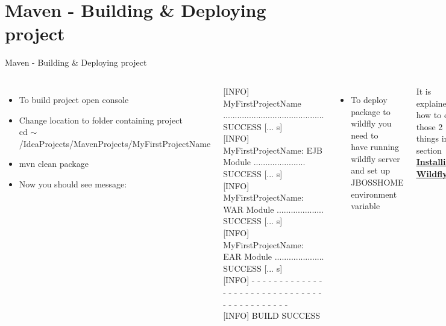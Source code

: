 \documentclass[aspectratio=1610,english]{beamer} %
\begin{document}
	\section{Maven - Building \& Deploying project}
	\begin{frame}{Maven - Building \& Deploying project}
		\begin{columns}
				\begin{itemize}
					\tiny
					\color{black}
					\item To build project open console
					\item Change location to folder containing project \\
						cd $\sim$/IdeaProjects/MavenProjects/MyFirstProjectName
					\item mvn clean package
					\item Now you should see message:
				\end{itemize}
				\tiny
				{[INFO]} MyFirstProjectName ........................................... SUCCESS {[... s]} \\
{[INFO]} MyFirstProjectName: EJB Module ...................... SUCCESS {[... s]} \\
{[INFO]} MyFirstProjectName: WAR Module .................... SUCCESS {[... s]} \\
{[INFO]} MyFirstProjectName: EAR Module ..................... SUCCESS {[... s]} \\
{[INFO]} - - - - - - - - - - - - - - - - - - - - - - - - - - - - - - - - - - - - - - - - - - - \\
{[INFO]} BUILD SUCCESS \\

				\begin{itemize}
					\tiny
					\color{black}
					\item To deploy package to wildfly you need to \\ 
						have running wildfly server \\ 
						and set up JBOSS\textunderscore HOME environment variable \\
				\end{itemize}
				\tiny
				It is explained how to do those 2 things in section
				\hyperlink{page.8}{\textbf{\underline{Installing Wildfly}}} \\


\end{columns}
\end{frame}
\end{document}
